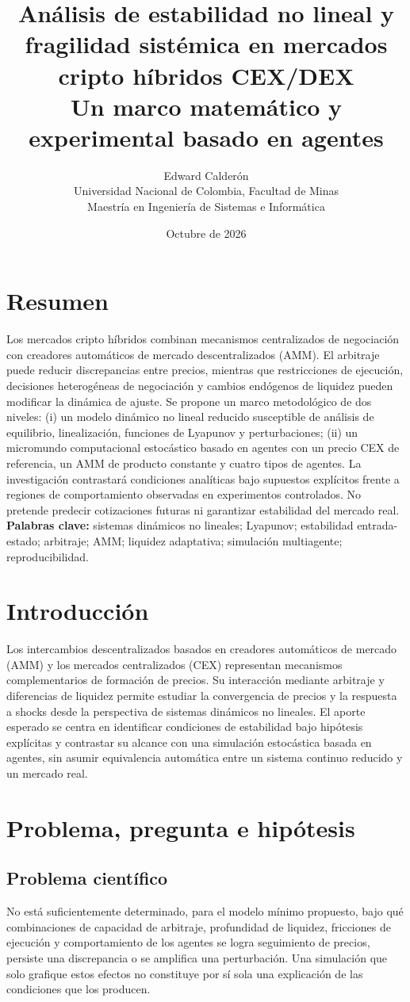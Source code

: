 \documentclass[11pt,a4paper]{article}
\title{\vspace{-1cm}\textbf{Análisis de estabilidad no lineal y fragilidad sistémica en mercados cripto híbridos CEX/DEX}\\[4pt]\large Un marco matemático y experimental basado en agentes}
\author{Edward Calderón\\\small Universidad Nacional de Colombia, Facultad de Minas\\\small Maestría en Ingeniería de Sistemas e Informática}
\date{Octubre de 2026}
\begin{document}
\maketitle
\section{Resumen}
Los mercados cripto híbridos combinan mecanismos centralizados de negociación con creadores automáticos de mercado descentralizados (AMM). El arbitraje puede reducir discrepancias entre precios, mientras que restricciones de ejecución, decisiones heterogéneas de negociación y cambios endógenos de liquidez pueden modificar la dinámica de ajuste. Se propone un marco metodológico de dos niveles: (i) un modelo dinámico no lineal reducido susceptible de análisis de equilibrio, linealización, funciones de Lyapunov y perturbaciones; (ii) un micromundo computacional estocástico basado en agentes con un precio CEX de referencia, un AMM de producto constante y cuatro tipos de agentes. La investigación contrastará condiciones analíticas bajo supuestos explícitos frente a regiones de comportamiento observadas en experimentos controlados. No pretende predecir cotizaciones futuras ni garantizar estabilidad del mercado real.
\textbf{Palabras clave:} sistemas dinámicos no lineales; Lyapunov; estabilidad entrada-estado; arbitraje; AMM; liquidez adaptativa; simulación multiagente; reproducibilidad.
\section{Introducción}
Los intercambios descentralizados basados en creadores automáticos de mercado (AMM) y los mercados centralizados (CEX) representan mecanismos complementarios de formación de precios. Su interacción mediante arbitraje y diferencias de liquidez permite estudiar la convergencia de precios y la respuesta a shocks desde la perspectiva de sistemas dinámicos no lineales. El aporte esperado se centra en identificar condiciones de estabilidad bajo hipótesis explícitas y contrastar su alcance con una simulación estocástica basada en agentes, sin asumir equivalencia automática entre un sistema continuo reducido y un mercado real.

\section{Problema, pregunta e hipótesis}
\subsection{Problema científico}
No está suficientemente determinado, para el modelo mínimo propuesto, bajo qué combinaciones de capacidad de arbitraje, profundidad de liquidez, fricciones de ejecución y comportamiento de los agentes se logra seguimiento de precios, persiste una discrepancia o se amplifica una perturbación. Una simulación que solo grafique estos efectos no constituye por sí sola una explicación de las condiciones que los producen.
\end{document}
